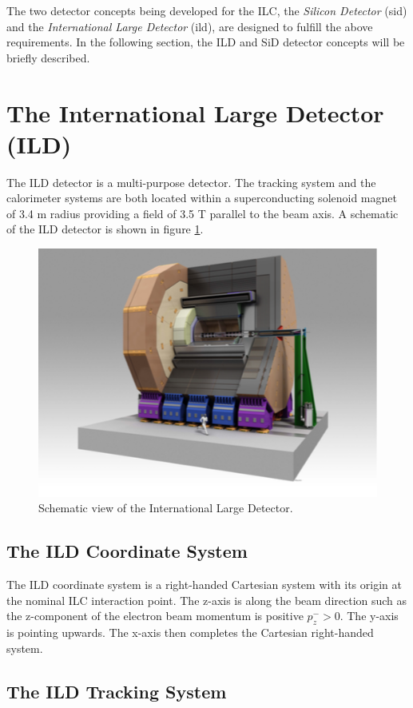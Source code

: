 The two detector concepts being developed for the ILC, the \textit{Silicon Detector} (\acrshort{sid}) and the \textit{International Large Detector} (\acrshort{ild}), are designed to fulfill the above requirements. In the following section, the ILD and SiD detector concepts will be briefly described.

\section{The International Large Detector (ILD)}
\label{sec:ILD}

The ILD detector is a multi-purpose detector. The tracking system and the calorimeter systems are both located within a superconducting solenoid magnet of 3.4 m radius providing a field of 3.5 T parallel to the beam axis. A schematic of the ILD detector is shown in figure \ref{fig:ILD}.

\begin{figure}[htbp!]
  \centering
  \includegraphics[width=0.7\linewidth]{chap2/fig/ILD_full.png}
  \caption{Schematic view of the International Large Detector. \cite{ILC_TDR_Vol4}} \label{fig:ILD}
\end{figure}

\subsection{The ILD Coordinate System}

The ILD coordinate system \cite{ILDCoordinates} is a right-handed Cartesian system with its origin at the nominal ILC interaction point. The z-axis is along the beam direction such as the z-component of the electron beam momentum is positive $p^-_z > 0$. The y-axis is pointing upwards. The x-axis then completes the Cartesian right-handed system.

\subsection{The ILD Tracking System}

